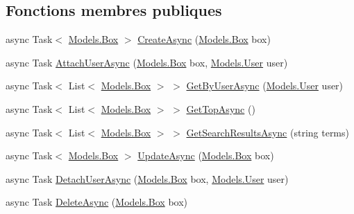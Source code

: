 \subsection*{Fonctions membres publiques}
\begin{DoxyCompactItemize}
\item 
async Task$<$ \hyperlink{class_boxes_1_1_models_1_1_box}{Models.\+Box} $>$ \hyperlink{class_boxes_1_1_services_1_1_box_1_1_box_service_a98111b1d222b2377a2ff0430a7bf990f}{Create\+Async} (\hyperlink{class_boxes_1_1_models_1_1_box}{Models.\+Box} box)
\item 
async Task \hyperlink{class_boxes_1_1_services_1_1_box_1_1_box_service_ad672389a531d5723ee32e5fedecb47cc}{Attach\+User\+Async} (\hyperlink{class_boxes_1_1_models_1_1_box}{Models.\+Box} box, \hyperlink{class_boxes_1_1_models_1_1_user}{Models.\+User} user)
\item 
async Task$<$ List$<$ \hyperlink{class_boxes_1_1_models_1_1_box}{Models.\+Box} $>$ $>$ \hyperlink{class_boxes_1_1_services_1_1_box_1_1_box_service_ad8dd19a1b6af99253255967254a59965}{Get\+By\+User\+Async} (\hyperlink{class_boxes_1_1_models_1_1_user}{Models.\+User} user)
\item 
async Task$<$ List$<$ \hyperlink{class_boxes_1_1_models_1_1_box}{Models.\+Box} $>$ $>$ \hyperlink{class_boxes_1_1_services_1_1_box_1_1_box_service_af7549dfaddbe24950bda7c4006b8acbe}{Get\+Top\+Async} ()
\item 
async Task$<$ List$<$ \hyperlink{class_boxes_1_1_models_1_1_box}{Models.\+Box} $>$ $>$ \hyperlink{class_boxes_1_1_services_1_1_box_1_1_box_service_a29f540c470f685159f69ec249af6ee53}{Get\+Search\+Results\+Async} (string terms)
\item 
async Task$<$ \hyperlink{class_boxes_1_1_models_1_1_box}{Models.\+Box} $>$ \hyperlink{class_boxes_1_1_services_1_1_box_1_1_box_service_aef8ea78e9c4a70935ac11e57583b8fea}{Update\+Async} (\hyperlink{class_boxes_1_1_models_1_1_box}{Models.\+Box} box)
\item 
async Task \hyperlink{class_boxes_1_1_services_1_1_box_1_1_box_service_a0e27813284c325af2a7ea267c34a8d95}{Detach\+User\+Async} (\hyperlink{class_boxes_1_1_models_1_1_box}{Models.\+Box} box, \hyperlink{class_boxes_1_1_models_1_1_user}{Models.\+User} user)
\item 
async Task \hyperlink{class_boxes_1_1_services_1_1_box_1_1_box_service_a16d678fa58baae07fbb4d548b149c278}{Delete\+Async} (\hyperlink{class_boxes_1_1_models_1_1_box}{Models.\+Box} box)
\end{DoxyCompactItemize}



